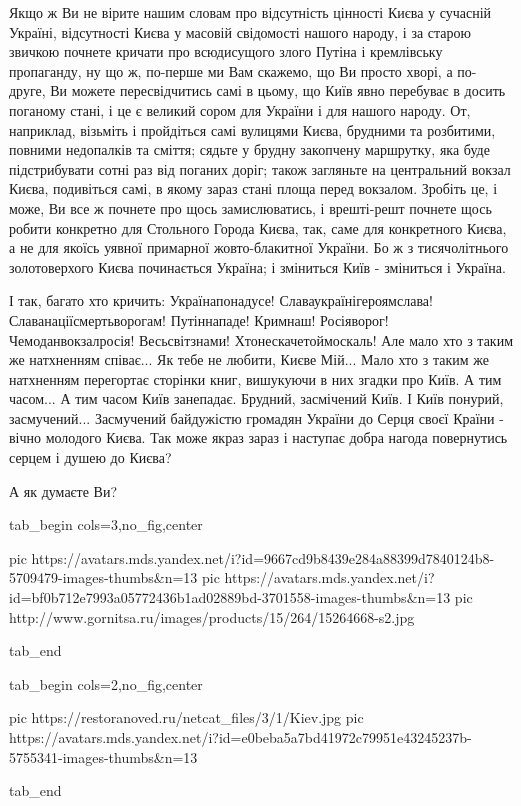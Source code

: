 Якщо ж Ви не вірите нашим словам про відсутність цінності Києва у сучасній
Україні, відсутності Києва у масовій свідомості нашого народу, і за старою
звичкою почнете кричати про всюдисущого злого Путіна і кремлівську пропаганду,
ну що ж, по-перше ми Вам скажемо, що Ви просто хворі, а по-друге, Ви можете
пересвідчитись самі в цьому, що Київ явно перебуває в досить поганому стані, і
це є великий сором для України і для нашого народу. От, наприклад, візьміть і
пройдіться самі вулицями Києва, брудними та розбитими, повними недопалків та
сміття; сядьте у брудну закопчену маршрутку, яка буде підстрибувати сотні раз
від поганих доріг; також загляньте на центральний вокзал Києва, подивіться
самі, в якому зараз стані площа перед вокзалом.  Зробіть це, і може, Ви все ж
почнете про щось замислюватись, і врешті-решт почнете щось робити конкретно для
Стольного Города Києва, так, саме для конкретного Києва, а не для якоїсь уявної
примарної жовто-блакитної України. Бо ж з тисячолітнього золотоверхого Києва
починається Україна; і зміниться Київ - зміниться і Україна.

І так, багато хто кричить: Українапонадусе! Славаукраїнігероямслава!
Славанаціїсмертьворогам! Путіннападе! Кримнаш! Росіяворог!
Чемоданвокзалросія!  Весьсвітзнами! Хтонескачетоймоскаль! Але мало хто з таким
же натхненням співає... Як тебе не любити, Києве Мій... Мало хто з таким же
натхненням перегортає сторінки книг, вишукуючи в них згадки про Київ.  А тим
часом... А тим часом Київ занепадає.  Брудний, засмічений Київ. І Київ понурий,
засмучений... Засмучений байдужістю громадян України до Серця своєї Країни -
вічно молодого Києва. Так може якраз зараз і наступає добра нагода повернутись
серцем і душею до Києва?

А як думаєте Ви?

\ifcmt
  tab_begin cols=3,no_fig,center

		 pic https://avatars.mds.yandex.net/i?id=9667cd9b8439e284a88399d7840124b8-5709479-images-thumbs&n=13
     pic https://avatars.mds.yandex.net/i?id=bf0b712e7993a05772436b1ad02889bd-3701558-images-thumbs&n=13
		 pic http://www.gornitsa.ru/images/products/15/264/15264668-s2.jpg

  tab_end
\fi


\ifcmt
  tab_begin cols=2,no_fig,center

     pic https://restoranoved.ru/netcat_files/3/1/Kiev.jpg
		 pic https://avatars.mds.yandex.net/i?id=e0beba5a7bd41972c79951e43245237b-5755341-images-thumbs&n=13

  tab_end
\fi

